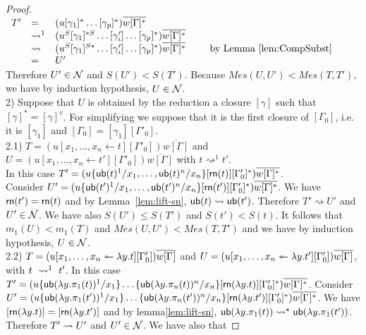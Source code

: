 \documentclass[orivec]{llncs}
\begin{document}
\begin{proof}
$
\begin{array}{llll}
 T' & = & (u[\gamma_1]^* \dots[\gamma_p]^*)\overline{w[\Gamma]^*} & \\
    & \rightsquigarrow^1 & (u^S[\gamma_1]^{*S} \dots [\gamma'_i]\dots [\gamma_p]^*)\overline{w[\Gamma]^*} & \\
    & \rightsquigarrow & (u^S[\gamma_1]^{S*} \dots [\gamma'_i]\dots [\gamma_p]^*)\overline{w[\Gamma]^*} & \hspace{0.5cm} \mbox{by Lemma~\ref{lem:CompSubst}  }\\
    & = & U' &
\end{array}
$
\\
Therefore $U'\in\mathcal{N}$ and $S(U')<S(T')$. Because $Mes(U,U') < Mes(T,T')$, we have by induction hypothesis, $U\in\mathcal{N}$.
%
%
\medskip
\\
2) Suppose that $U$ is obtained by the reduction a closure $[\gamma]$ such that  $[\gamma]^* = [\gamma]^v$. For simplifying we suppose that it is the first closure of $[\Gamma_0]$, i.e. it is $[\gamma_1]$ and $[\Gamma_0] = [\gamma_1][\Gamma'_0]$.
\smallskip
\\
2.1)  $T = (u[x_1,\dots,x_n \leftarrow t][\Gamma'_0])\overline{w[\Gamma]}$ and $U = (u[x_1,\dots,x_n \leftarrow t'][\Gamma'_0])\overline{w[\Gamma]}$ with $t\rightsquigarrow^1 t'$.
\\
In this case $T' = (u\{{\mathsf{ub}}(t)^1/x_1,\dots,{\mathsf{ub}}(t)^n/x_n\}[{\mathsf{rn}} (t)][\Gamma'_0]^*)\overline{w[\Gamma]^*}$.
\\
Consider $U' = (u\{{\mathsf{ub}}(t')^1/x_1,\dots,{\mathsf{ub}}(t')^n/x_n\}[{\mathsf{rn}} (t')][\Gamma'_0]^*)\overline{w[\Gamma]^*}$. We have ${\mathsf{rn}} (t') = {\mathsf{rn}} (t)$ and by Lemma~\ref{lem:lift-sn}, ${\mathsf{ub}} (t) \rightsquigarrow {\mathsf{ub}} (t')$. Therefore $T'\rightsquigarrow U'$ and $U'\in\mathcal{N}$. We have also $S(U')\leq S(T')$ and $S(t')<S(t)$. It follows that  $m_1(U) < m_1(T)$ and  $Mes(U,U') < Mes(T,T')$ and we have by induction hypothesis, $U\in\mathcal{N}$.
%
\smallskip
\\
2.2)
$T =  (u\distr xyt[\Gamma_0'])\overline{w\G}$ and
$U =  (u\distr xy{t'}[\Gamma_0'])\overline{w\G}$, with $t ~\rewrite^1~ t'$.
In this case
$T' = (u\sub{x_1}{\sn(\lambda y.\pi_1(t))^1}\dots\sub{x_n}{\sn(\lambda
y.\pi_n(t))^n}[\sh(\lambda y.t)][\Gamma_0']^*)\overline{w\G^*}$.
Consider
$U' = (u\sub{x_1}{\sn(\lambda
y.\pi_1(t'))^1}\dots\sub{x_n}{\sn(\lambda y.\pi_n(t'))^n}[\sh(\lambda
y.t')][\Gamma_0']^*)\overline{w\G^*}$.
We have $[{\mathsf{rn}}(\lambda y.t)]=[{\mathsf{rn}}(\lambda y.t')]$ and by lemma\ref{lem:lift-sn},
$\sn(\lambda y.\pi_1(t)) \rewrite^\star \sn(\lambda y.\pi_1(t'))$.
Therefore $T'\rewrite U'$ and $U'\in\mathcal{N}$. We have also that

\end{proof}
\end{document}
